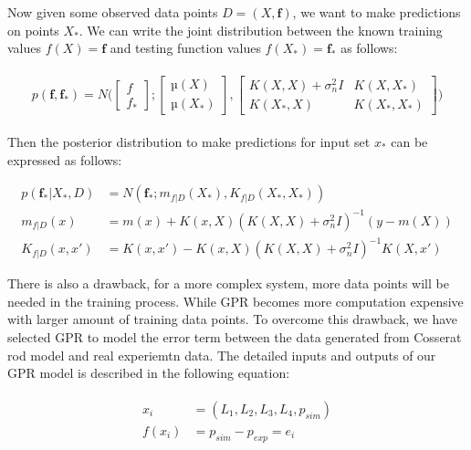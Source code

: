 Now given some observed data points $D=(X,\mathbf{f})$, we want to make predictions on points $X_*$. We can write the joint distribution between the known training values $f(X)=\mathbf{f}$ and testing function values $f(X_*)=\mathbf{f}_*$ as follows:

\begin{align}
    \begin{split}
    p(\mathbf{f},\mathbf{f_*}) = N 
    \big(
      \begin{bmatrix}
        f \\ f_*
      \end{bmatrix};
      \begin{bmatrix}
        µ(X) \\ µ(X_*)
      \end{bmatrix},
      \begin{bmatrix}
        K(X, X)+\sigma^2_nI &  K(X, X_*) \\ K(X_*, X) & K(X_*, X_*)
      \end{bmatrix}
      \big)
    \end{split}
    \label{eq:X11}
\end{align}

Then the posterior distribution to make predictions for input set $x_*$ can be expressed as follows:

\begin{align}
    p(\mathbf{f}_* | X_*, D) &= N(\mathbf{f_*}; m_{f|D}(X_*), K_{f|D}(X_*, X_*))\\
             m_{f|D}(x) &= m(x) + K(x, X)(K(X,X)+\sigma^2_nI)^{-1}(y - m(X))\\
             K_{f|D}(x,x') &= K(x, x') - K(x, X)(K(X,X)+\sigma^2_nI)^{-1}K(X, x')
\label{eq:19}
\end{align}


There is also a drawback, for a more complex system, more data points will be needed in the training process. While GPR becomes more computation expensive with larger amount of training data points. To overcome this drawback, we have selected GPR to model the error term between the data generated from Cosserat rod model and real experiemtn data. The detailed  inputs and outputs of our GPR model is described in the following equation:

\begin{align}
    \begin{split}
        x_i&=(L_1,L_2,L_3,L_4, p_{sim})\\
        f(x_i) &= p_{sim}-p_{exp} = e_i\\
    \end{split}
    \label{eq:X12}
\end{align}

